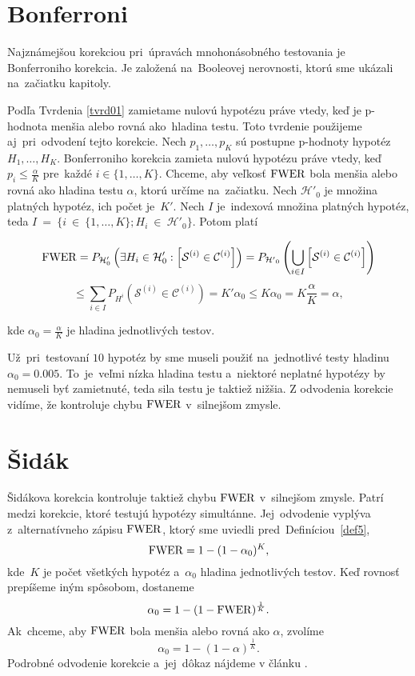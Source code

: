 \section{Bonferroni}

Najznámejšou korekciou pri~úpravách mnohonásobného testovania je Bonferroniho korekcia. 
Je založená na~Booleovej nerovnosti, ktorú sme ukázali na~začiatku kapitoly. 

Podľa Tvrdenia \ref{tvrd01} zamietame nulovú hypotézu práve vtedy, keď je p-hodnota menšia alebo rovná ako~hladina testu. 
Toto tvrdenie použijeme aj~pri~odvodení tejto korekcie. 
Nech $p_1, \dots, p_K$ sú postupne p-hodnoty hypotéz $H_1, \dots, H_K$. 
Bonferroniho korekcia zamieta nulovú hypotézu práve vtedy, keď $p_i \leq \frac{\alpha}{K}$ 
pre~každé $i \in \{1, \dots, K\}$. 
Chceme, aby veľkosť ${\rm FWER}$ bola menšia alebo rovná ako hladina testu $\alpha$, ktorú určíme na~začiatku. 
Nech $\mathcal{H'}_0$ je množina platných hypotéz, ich počet je~$K'$. 
Nech $I$ je~indexová množina platných hypotéz, teda $I~=~\{ i~\in~\{1, \dots, K\}; H_i ~\in~{\mathcal{H}}'_0 \}$. 
Potom platí 
\begin{center}
  $$ {\rm FWER} =  P_{\mathcal{H}'_0} \left( \exists H_i \in {\mathcal{H}}'_0: \left[ \mathcal{S}^{(i)} \in \mathcal{C}^{(i)} \right] \right) 
  = P_{\mathcal{H'}_0} \left( \bigcup_{i \in I} \left[ \mathcal{S}^{(i)} \in \mathcal{C}^{(i)} \right] \right) $$
  $$ \leq \sum_{i \in I} P_{H^i} \left( \mathcal{S}^{(i)} \in \mathcal{C}^{(i)} \right) 
  = K' \alpha_0 \leq K \alpha_0 = K \frac{\alpha}{K}  = \alpha, $$
\end{center}  
kde $\alpha_0 = \frac{\alpha}{K}$ je hladina jednotlivých testov. 

Už~pri~testovaní $10$ hypotéz by sme museli použiť na~jednotlivé testy hladinu $\alpha_0 = 0.005$. 
To~je~veľmi nízka hladina testu a~niektoré neplatné hypotézy by nemuseli byť zamietnuté, 
teda sila testu je taktiež nižšia. 
Z odvodenia korekcie vidíme, že kontroluje chybu ${\rm FWER}$ v~silnejšom zmysle. 

\section{Šidák}

Šidákova korekcia kontroluje taktiež chybu ${\rm FWER}$ v~silnejšom zmysle. 
Patrí medzi korekcie, ktoré testujú hypotézy simultánne. 
Jej~odvodenie vyplýva z~alternatívneho zápisu ${\rm FWER}$, 
ktorý sme uviedli pred~Definíciou~\ref{def5}, 
$$ {\rm FWER} = 1 - ( 1 - \alpha_0)^K, $$ 
kde~$K$ je počet všetkých hypotéz a~$\alpha_0$ hladina jednotlivých testov. 
Keď rovnosť prepíšeme iným spôsobom, dostaneme
$$ \alpha_0 = 1 - ( 1 - {\rm FWER} )^{\frac{1}{K}}. $$ 
Ak~chceme, aby ${\rm FWER}$ bola menšia alebo rovná ako $\alpha$, zvolíme 
$$ \alpha_0 = 1 - ( 1 - \alpha )^{\frac{1}{K}}. $$
Podrobné odvodenie korekcie a~jej~dôkaz nájdeme v článku \cite{Sidak67}. 

